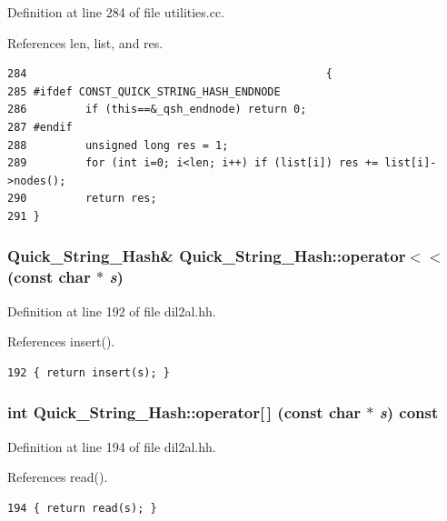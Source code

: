 Definition at line 284 of file utilities.cc.

References len, list, and res.



\footnotesize\begin{verbatim}284                                              {
285 #ifdef CONST_QUICK_STRING_HASH_ENDNODE
286         if (this==&_qsh_endnode) return 0;
287 #endif
288         unsigned long res = 1;
289         for (int i=0; i<len; i++) if (list[i]) res += list[i]->nodes();
290         return res;
291 }
\end{verbatim}\normalsize 
{}
\subsubsection{\setlength{\rightskip}{0pt plus 5cm}Quick\_\-String\_\-Hash\& Quick\_\-String\_\-Hash::operator$<$$<$ (const char $\ast$ {\em s})\hspace{0.3cm}{\tt  [inline]}}\label{classQuick__String__Hash_a3}




Definition at line 192 of file dil2al.hh.

References insert().



\footnotesize\begin{verbatim}192 { return insert(s); }
\end{verbatim}\normalsize 
{}
\subsubsection{\setlength{\rightskip}{0pt plus 5cm}int Quick\_\-String\_\-Hash::operator[$\,$] (const char $\ast$ {\em s}) const\hspace{0.3cm}{\tt  [inline]}}\label{classQuick__String__Hash_a5}




Definition at line 194 of file dil2al.hh.

References read().



\footnotesize\begin{verbatim}194 { return read(s); }
\end{verbatim}\normalsize 
{}
